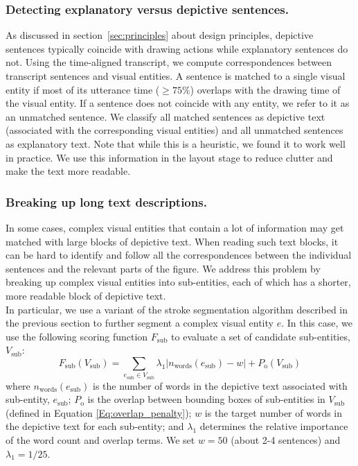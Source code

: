 \subsubsection{Detecting explanatory versus depictive sentences.} 
As discussed in section~\ref{sec:principles} about design principles, depictive sentences typically coincide with drawing actions while explanatory sentences do not. Using the time-aligned transcript,
we compute correspondences between transcript sentences and visual entities.
A sentence is matched to a single visual entity if most of its utterance
time ($ \geq 75\% $) overlaps with the drawing time of the visual entity.
If a sentence does not coincide with any entity, we refer to it as an unmatched
sentence. We classify all matched sentences as depictive text (associated with the corresponding visual entities) and all unmatched sentences as explanatory text.
%
Note that while this is a heuristic, we found it to work well in practice. 
%
We use this information in the layout stage to reduce clutter and make the text more readable.    

\subsubsection{Breaking up long text descriptions.}
%
In some cases, complex visual entities that contain a lot of information may get matched with large blocks of depictive text.
%
When reading such text blocks, it can be hard to identify and follow all the correspondences between the individual sentences and the relevant parts of the figure.
%
We address this problem by breaking up complex visual entities into sub-entities, each of which has a shorter, more readable block of depictive text.\\

In particular, we use a variant of the stroke segmentation algorithm described in the previous section to further segment a complex visual entity $e$.
%
In this case, we use the following scoring function $F_\text{sub}$ to evaluate a set of candidate sub-entities, $V_\text{sub}$:
%
\begin{equation} F_\text{sub}(V_\text{sub}) = \sum_{e_\text{sub} \in V_\text{sub}}\lambda_{1}\lvert n_\text{words}(e_\text{sub}) - w \rvert + P_\text{o}(V_\text{sub}) \end{equation} 
%
where $n_\text{words}(e_\text{sub})$ is the number of words in the depictive text associated with sub-entity, $e_\text{sub}$; $P_\text{o}$ is the overlap between bounding boxes of sub-entities in $V_\text{sub}$ (defined in Equation \ref{Eq:overlap_penalty}); $w$ is the target number of words in the depictive text for each sub-entity; and $\lambda_{1}$ determines the relative importance of the word count and overlap terms. We set $w = 50$ (about 2-4 sentences) and $\lambda_{1} = 1/25$.\\

